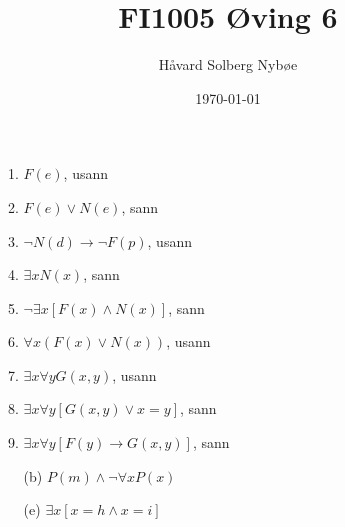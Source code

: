 \documentclass[a4paper, 12pt]{article}  %
\title{FI1005 Øving 6}                         %
\author{Håvard Solberg Nybøe}           %
\date{\today}                           %
\begin{document}
\maketitle


\begin{enumerate}
    \item [\boxed{1}]
    \begin{enumerate}
        \item \(F(e)\), usann
        \item \(F(e) \lor N(e)\), sann
        \item \(\neg N(d) \to \neg F(p)\), usann
        \item \(\exists x N(x)\), sann
        \item \(\neg \exists x [F(x) \land N(x)]\), sann
        \item \(\forall x (F(x) \lor N(x))\), usann
        \item \(\exists x \forall y G(x,y)\), usann
        \item \(\exists x \forall y [G(x,y) \lor x=y]\), sann
        \item \(\exists x \forall y [F(y) \to G(x, y)]\), sann
    \end{enumerate}
    \item [\boxed{2}]
    \begin{enumerate}
        \item [(b)] \(P(m) \land \neg \forall x P(x)\)
        \item [(e)] \(\exists x [x=h \land x=i]\)
    \end{enumerate}
    \item [\boxed{3}]
    \item [\boxed{4}]
\end{enumerate}

\end{document}
